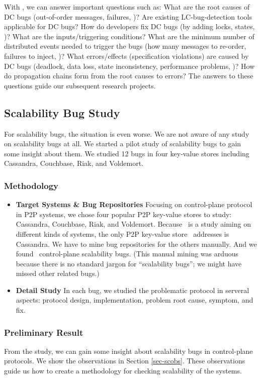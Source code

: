 With \taxdc, we can answer important questions such as: What are the root causes
of DC bugs (out-of-order messages, failures, \etc)?  Are existing
LC-bug-detection tools applicable for DC bugs? How do developers fix DC bugs (by
adding locks, states, \etc)? What are the inputs/triggering conditions?  What
are the minimum number of distributed events needed to trigger the bugs (how
many messages to re-order, failures to inject, \etc)?  What errors/effects
(specification violations) are caused by DC bugs (deadlock, data loss, state
inconsistency, performance problems, \etc)? How do propagation chains form from
the root causes to errors? The answers to these questions guide our subsequent
research projects.

\subsection{Scalability Bug Study}
\label{sc-study}

For scalability bugs, the situation is even worse. We are not aware of any study
on scalability bugs at all. We started a pilot study of scalability bugs to gain
some insight about them. We studied 12 bugs in four key-value stores including
Cassandra, Couchbase, Riak, and Voldemort.

\subsubsection{Methodology}

\begin{itemize}

\item {\bf Target Systems \& Bug Repositories} Focusing on control-plane
protocol in P2P systems, we chose four popular P2P key-value stores to study:
Cassandra, Couchbase, Riak, and Voldemort. Because \cbs\ is a study aiming on
different kinds of systems, the only P2P key-value store \cbs\ addresses is
Cassandra. We have to mine bug repositories for the others manually.  And we
found \numStudy\ control-plane scalability bugs.  (This manual mining was arduous
because there is no standard jargon for ``scalability bugs''; we might have
missed other related bugs.)

\item {\bf Detail Study} In each bug, we studied the problematic protocol in
serveral aspects: protocol design, implementation, problem root cause, symptom,
and fix.

\end{itemize}

\subsubsection{Preliminary Result}

From the study, we can gain some insight about scalability bugs in control-plane
protocols. We show the observations in Section \ref{sec-scobs}. These
observations guide us how to create a methodology for checking scalability of
the systems.

